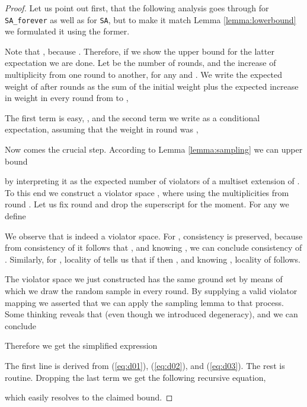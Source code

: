 \documentclass[12pt]{article}
\theoremstyle{remark}
\def\stageII{\texttt{SA}}
\def\stageIIforever{\texttt{SA\_forever}}
\begin{document}
\begin{proof}

Let us point out first, that the following analysis goes through for
\stageIIforever{ }as well
as for \stageII, but to make it match Lemma \ref{lemma:lowerbound} we formulated it using
the former.

Note that , because . Therefore, if we show the upper bound for the latter expectation we are done. Let  
 be the number of rounds, and
 the increase of multiplicity from one round to another, for any  and
.
We write the expected weight of  after  rounds as the sum of the initial 
weight plus the expected increase in weight in every round from  to ,

The first term is easy, , and the second term we write as a conditional 
expectation,
assuming that the weight in round  was ,


Now comes the crucial step. According to Lemma \ref{lemma:sampling} we can 
upper bound

by interpreting it as the expected 
number of violators of a
multiset extension of .
To this end we construct a violator space
, where 
using the multiplicities from round .
Let us fix round  and drop the superscript for the moment. For any
 we define

We observe that  is indeed a violator space. For
, consistency
is preserved, because from consistency of  it follows that 
, and knowing
, we can conclude consistency of . 
Similarly,
for , locality of  tells us that if
 then
, and knowing ,
locality of  follows.

The violator space we just constructed has the same ground set  by means of which we 
draw the random
sample  in every round. By supplying a valid violator mapping we asserted that we can 
apply
the sampling lemma to that process.
Some thinking reveals that  (even though we 
introduced
degeneracy), and we can conclude

Therefore we get the simplified expression

\begin{center}

\end{center}

The first line is derived from (\ref{eq:d01}), (\ref{eq:d02}), and (\ref{eq:d03}). The rest is routine. 
Dropping the last term  we get the following recursive equation,

which easily resolves to the claimed bound.
\end{proof}
\end{document}
